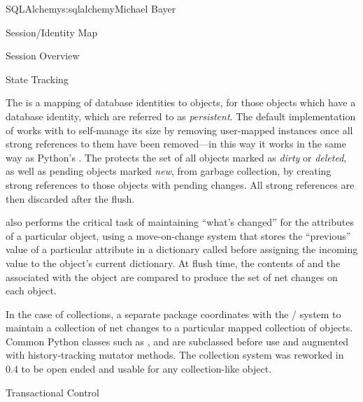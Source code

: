 \begin{aosachapter}{SQLAlchemy}{s:sqlalchemy}{Michael Bayer}
\begin{aosasect1}{Session/Identity Map}
\begin{aosasect2}{Session Overview}
\end{aosasect2}

\begin{aosasect2}{State Tracking}

The  is a mapping of database identities to  objects,
for those objects which have a database identity, which are referred to as \emph{persistent}.
The default implementation of  works with  to self-manage
its size by removing user-mapped instances once all strong references to them have been removed---in 
this way it works in the same way as Python's .  The 
protects the set of all objects marked as \emph{dirty} or \emph{deleted}, as well as pending objects
marked \emph{new}, from garbage collection, by creating strong
references to those objects with pending changes.  All strong references are then discarded after the flush.

 also performs the critical task of maintaining ``what's changed''
for the attributes of a particular object, using a move-on-change system that
stores the ``previous'' value of a particular attribute in a dictionary
called  before assigning the incoming value to the
object's current dictionary.   At flush time, the contents of 
and the  associated with the object are compared to produce
the set of net changes on each object.

In the case of collections, a separate  package coordinates
with the \linebreak {}/
system to maintain a collection of net changes to a particular mapped collection of
objects.   Common Python classes such as ,  and  are subclassed
before use and augmented with history-tracking mutator methods.   The collection system
was reworked in 0.4 to be open ended and usable for any collection-like object.

\end{aosasect2}

\begin{aosasect2}{Transactional Control}


\end{aosasect2}
\end{aosasect1}
\end{aosachapter}
